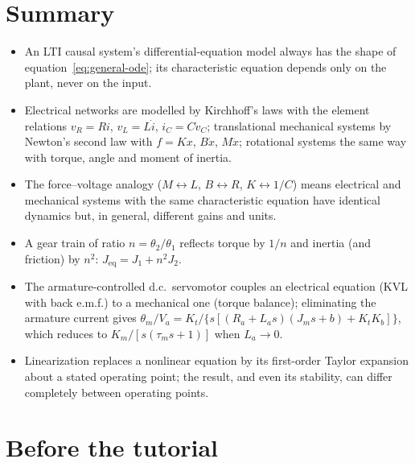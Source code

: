 \documentclass[11pt,a4paper]{article}
\begin{document}
\section*{Summary}

\begin{itemize}
\item An LTI causal system's differential-equation model always has the shape
      of equation~\eqref{eq:general-ode}; its characteristic equation depends
      only on the plant, never on the input.
\item Electrical networks are modelled by Kirchhoff's laws with the element
      relations $v_R=Ri$, $v_L=L\dot i$, $i_C=C\dot v_C$; translational
      mechanical systems by Newton's second law with $f=Kx$, $B\dot x$,
      $M\ddot x$; rotational systems the same way with torque, angle and
      moment of inertia.
\item The force--voltage analogy ($M\leftrightarrow L$, $B\leftrightarrow R$,
      $K\leftrightarrow 1/C$) means electrical and mechanical systems with the
      same characteristic equation have identical dynamics but, in general,
      different gains and units.
\item A gear train of ratio $n=\theta_2/\theta_1$ reflects torque by $1/n$ and
      inertia (and friction) by $n^2$: $J_{\text{eq}}=J_1+n^2J_2$.
\item The armature-controlled d.c.\ servomotor couples an electrical equation
      (KVL with back e.m.f.) to a mechanical one (torque balance); eliminating
      the armature current gives $\theta_m/V_a=K_t/\{s[(R_a+L_as)(J_ms+b)+K_tK_b]\}$,
      which reduces to $K_m/[s(\tau_ms+1)]$ when $L_a\to0$.
\item Linearization replaces a nonlinear equation by its first-order Taylor
      expansion about a stated operating point; the result, and even its
      stability, can differ completely between operating points.
\end{itemize}

\section*{Before the tutorial}
\end{document}
